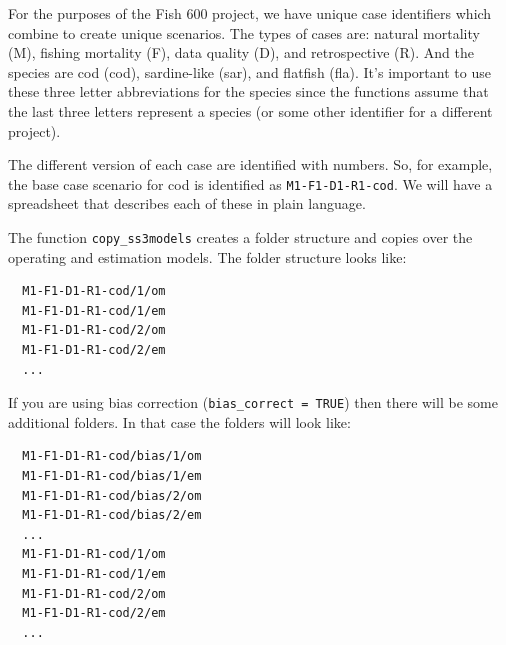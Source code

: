 \documentclass[12pt]{article}
\begin{document}
For the purposes of the Fish 600 project, we have unique case identifiers which 
combine to create unique scenarios. The types of cases are: natural mortality 
(M), fishing mortality (F), data quality (D), and retrospective (R). And the 
species are cod (cod), sardine-like (sar), and flatfish (fla). It's important 
to use these three letter abbreviations for the species since the functions 
assume that the last three letters represent a species (or some other 
identifier for a different project).

The different version of each case are identified with numbers. So, for 
example, the base case scenario for cod is identified as 
\texttt{M1-F1-D1-R1-cod}. We will have a spreadsheet that describes each of 
these in plain language.








The function \texttt{copy\_ss3models} creates a folder structure and copies 
over the operating and estimation models. The folder structure looks like:

\begin{verbatim}
  M1-F1-D1-R1-cod/1/om
  M1-F1-D1-R1-cod/1/em
  M1-F1-D1-R1-cod/2/om
  M1-F1-D1-R1-cod/2/em
  ...
\end{verbatim}

\noindent
If you are using bias correction (\texttt{bias\_correct = TRUE}) then there 
will be some additional folders. In that case the folders will look like:

\begin{verbatim}
  M1-F1-D1-R1-cod/bias/1/om
  M1-F1-D1-R1-cod/bias/1/em
  M1-F1-D1-R1-cod/bias/2/om
  M1-F1-D1-R1-cod/bias/2/em
  ...
  M1-F1-D1-R1-cod/1/om
  M1-F1-D1-R1-cod/1/em
  M1-F1-D1-R1-cod/2/om
  M1-F1-D1-R1-cod/2/em
  ...
\end{verbatim}
\end{document}
